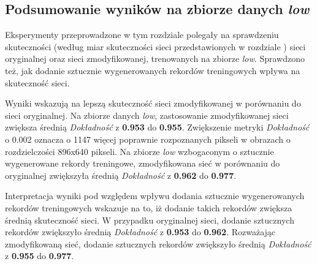 \subsection{Podsumowanie wyników na zbiorze danych \textit{low}}
Eksperymenty przeprowadzone w tym rozdziale polegały na sprawdzeniu skuteczności (według miar skuteczności sieci przedstawionych w rozdziale ) sieci oryginalnej oraz sieci zmodyfikowanej, trenowanych na zbiorze \textit{low}.
Sprawdzono też, jak dodanie sztucznie wygenerowanych rekordów treningowych wpływa na skuteczność sieci.


Wyniki wskazują na lepszą skuteczność sieci zmodyfikowanej w porównaniu do sieci oryginalnej.
Na zbiorze danych \textit{low}, zastosowanie zmodyfikowanej sieci zwiększa średnią \textit{Dokładność} z \textbf{0.953} do \textbf{0.955}.
Zwiększenie metryki \textit{Dokładność} o 0.002 oznacza o 1147 więcej poprawnie rozpoznanych pikseli w obrazach o rozdzielczości 896x640 pikseli. Na zbiorze \textit{low} wzbogaconym o sztucznie wygenerowane rekordy treningowe, zmodyfikowana sieć w porównaniu do oryginalnej zwiększyła średnią \textit{Dokładność} z \textbf{0.962} do \textbf{0.977}.


Interpretacja wyniki pod względem wpływu dodania sztucznie wygenerowanych rekordów treningowych wskazuje na to, iż dodanie takich rekordów zwiększa średnią skuteczność sieci. W przypadku oryginalnej sieci, dodanie sztucznych rekordów zwiększyło średnią \textit{Dokładność} z \textbf{0.953} do \textbf{0.962}. Rozważając zmodyfikowaną sieć, dodanie sztucznych rekordów zwiększyło średnią \textit{Dokładność} z \textbf{0.955} do \textbf{0.977}.

